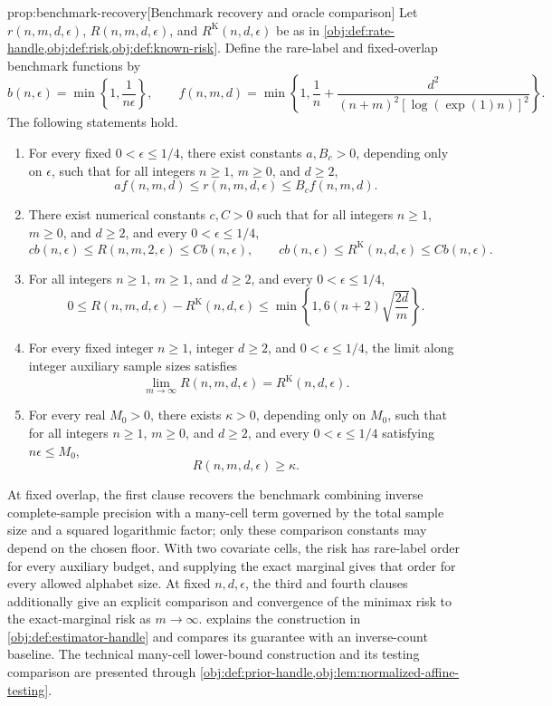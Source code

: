 \documentclass[11pt]{article}
\begin{document}
\begin{propositionv}{prop:benchmark-recovery}[Benchmark recovery and oracle comparison]
Let \(r(n,m,d,\epsilon)\), \(R(n,m,d,\epsilon)\), and \(R^{\mathrm K}(n,d,\epsilon)\) be as in \cref{obj:def:rate-handle,obj:def:risk,obj:def:known-risk}. Define the rare-label and fixed-overlap benchmark functions by
\[
b(n,\epsilon)=\min\left\{1,\frac{1}{n\epsilon}\right\},
\qquad
f(n,m,d)=\min\left\{1,\frac{1}{n}
+\frac{d^2}{(n+m)^2[\log(\exp(1)n)]^2}\right\}.
\]
The following statements hold.
\begin{enumerate}
\item For every fixed \(0<\epsilon\le 1/4\), there exist constants \(a,B_c>0\), depending only on \(\epsilon\), such that for all integers \(n\ge1\), \(m\ge0\), and \(d\ge2\),
\[
a f(n,m,d)\le r(n,m,d,\epsilon)\le B_c f(n,m,d).
\]

\item There exist numerical constants \(c,C>0\) such that for all integers \(n\ge1\), \(m\ge0\), and \(d\ge2\), and every \(0<\epsilon\le1/4\),
\[
c b(n,\epsilon)\le R(n,m,2,\epsilon)\le C b(n,\epsilon),
\qquad
c b(n,\epsilon)\le R^{\mathrm K}(n,d,\epsilon)\le C b(n,\epsilon).
\]

\item For all integers \(n\ge1\), \(m\ge1\), and \(d\ge2\), and every \(0<\epsilon\le1/4\),
\[
0\le R(n,m,d,\epsilon)-R^{\mathrm K}(n,d,\epsilon)
\le \min\left\{1,6(n+2)\sqrt{\frac{2d}{m}}\right\}.
\]

\item For every fixed integer \(n\ge1\), integer \(d\ge2\), and \(0<\epsilon\le1/4\), the limit along integer auxiliary sample sizes satisfies
\[
\lim_{m\to\infty}R(n,m,d,\epsilon)=R^{\mathrm K}(n,d,\epsilon).
\]

\item For every real \(M_0>0\), there exists \(\kappa>0\), depending only on \(M_0\), such that for all integers \(n\ge1\), \(m\ge0\), and \(d\ge2\), and every \(0<\epsilon\le1/4\) satisfying \(n\epsilon\le M_0\),
\[
R(n,m,d,\epsilon)\ge\kappa.
\]
\end{enumerate}
\end{propositionv}

At fixed overlap, the first clause recovers the benchmark combining inverse complete-sample precision with a many-cell term governed by the total sample size and a squared logarithmic factor; only these comparison constants may depend on the chosen floor. With two covariate cells, the risk has rare-label order for every auxiliary budget, and supplying the exact marginal gives that order for every allowed alphabet size. At fixed \(n,d,\epsilon\), the third and fourth clauses additionally give an explicit comparison and convergence of the minimax risk to the exact-marginal risk as \(m\to\infty\).  explains the construction in \cref{obj:def:estimator-handle} and compares its guarantee with an inverse-count baseline. The technical many-cell lower-bound construction and its testing comparison are presented through \cref{obj:def:prior-handle,obj:lem:normalized-affine-testing}.
\end{document}
